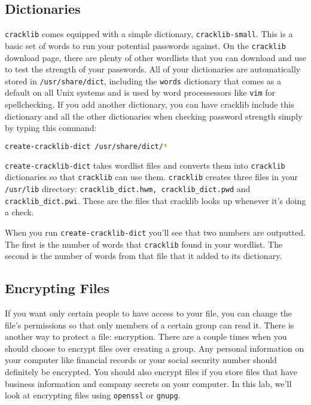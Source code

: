 \documentclass[11pt,a4paper]{article}
\begin{document}
\subsection*{Dictionaries}
\verb|cracklib| comes equipped with a simple dictionary, \verb|cracklib-small|. This is a basic set of words to run your potential passwords against. On the \verb|cracklib| download page, there are plenty of other wordlists that you can download and use to test the strength of your passwords. All of your dictionaries are automatically stored in \verb|/usr/share/dict|, including the \verb|words| dictionary that comes as a default on all Unix systems and is used by word processessors like \verb|vim| for spellchecking. If you add another dictionary, you can have cracklib include this dictionary and all the other dictionaries when checking password strength simply by typing this command:

\begin{lstlisting}[basicstyle=\ttfamily, backgroundcolor = \color{lightgray}, language = bash, xleftmargin = 0cm, framexleftmargin = 1em]
create-cracklib-dict /usr/share/dict/*
\end{lstlisting}

\verb|create-cracklib-dict| takes wordlist files and converts them into \verb|cracklib| dictionaries so that \verb|cracklib| can use them. \verb|cracklib| creates three files in your \verb|/usr/lib| directory: \verb|cracklib_dict.hwm, cracklib_dict.pwd| and \verb|cracklib_dict.pwi|. These are the files that cracklib looks up whenever it's doing a check.  

When you run \verb|create-cracklib-dict| you'll see that two numbers are outputted. The first is the number of words that \verb|cracklib| found in your wordlist. The second is the number of words from that file that it added to its dictionary.


\subsection*{Encrypting Files}

If you want only certain people to have access to your file, you can change the file's permissions so that only members of a certain group can read it. There is another way to protect a file: encryption. There are a couple times when you should choose to encrypt files over creating a group. Any personal information on your computer like financial records or your social security number should definitely be encrypted. You should also encrypt files if you store files that have business information and company secrets on your computer. In this lab, we'll look at encrypting files using \verb|openssl| or \verb|gnupg|.
\end{document}
